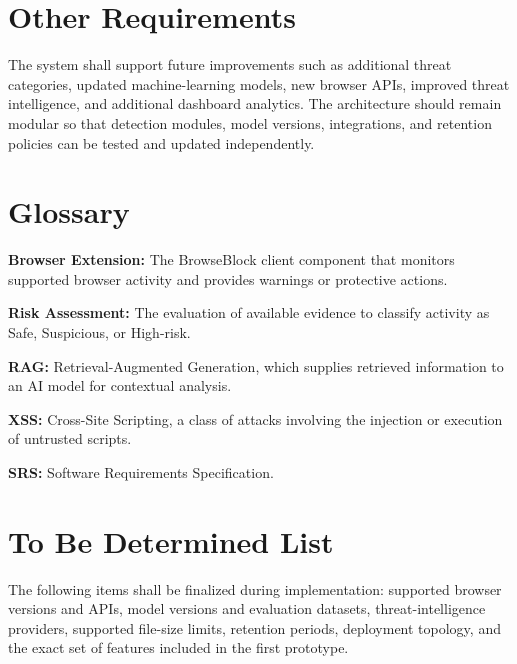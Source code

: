 \documentclass[12pt,a4paper]{report}
\begin{document}
\chapter{Other Requirements}

The system shall support future improvements such as additional threat categories, updated machine-learning models, new browser APIs, improved threat intelligence, and additional dashboard analytics. The architecture should remain modular so that detection modules, model versions, integrations, and retention policies can be tested and updated independently.\par

\appendix
\chapter{Glossary}

\textbf{Browser Extension:} The BrowseBlock client component that monitors supported browser activity and provides warnings or protective actions.\par
\textbf{Risk Assessment:} The evaluation of available evidence to classify activity as Safe, Suspicious, or High-risk.\par
\textbf{RAG:} Retrieval-Augmented Generation, which supplies retrieved information to an AI model for contextual analysis.\par
\textbf{XSS:} Cross-Site Scripting, a class of attacks involving the injection or execution of untrusted scripts.\par
\textbf{SRS:} Software Requirements Specification.\par

\chapter{To Be Determined List}

The following items shall be finalized during implementation: supported browser versions and APIs, model versions and evaluation datasets, threat-intelligence providers, supported file-size limits, retention periods, deployment topology, and the exact set of features included in the first prototype.\par
\end{document}
